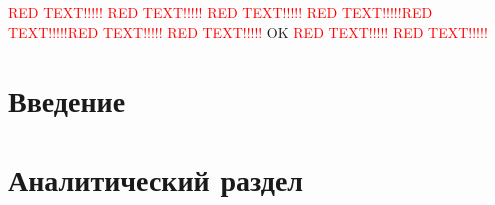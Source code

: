 \textcolor{red}{RED TEXT!!!!!}
\textcolor{red}{RED TEXT!!!!!} \textcolor{red}{RED TEXT!!!!!}
\textcolor{red}{RED TEXT!!!!!}\textcolor{red}{RED TEXT!!!!!}\textcolor{red}{RED TEXT!!!!!}
\textcolor{red}{RED TEXT!!!!!}
OK
\textcolor{red}{RED TEXT!!!!!}
\textcolor{red}{RED TEXT!!!!!}


\chapter*{Введение}

\chapter*{Аналитический раздел}

